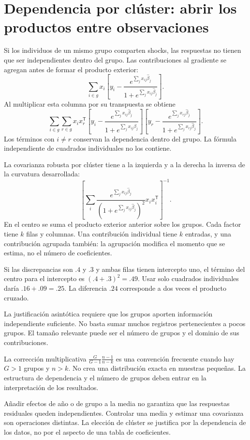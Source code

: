 \documentclass[11pt,a4paper]{article}
\newcommand{\T}{^{\mathsf T}}
\begin{document}
\clearpage
\section{Dependencia por clúster: abrir los productos entre observaciones}\label{logit58}
Si los individuos de un mismo grupo comparten shocks,
las respuestas no tienen que ser independientes dentro del grupo.
Las contribuciones al gradiente se agregan antes de formar el
producto exterior:
\[
\sum_{i\in g}x_i\left[
y_i-\frac{e^{\sum_jx_{ij}\widehat\beta_j}}
{1+e^{\sum_jx_{ij}\widehat\beta_j}}\right].
\]
Al multiplicar esta columna por su transpuesta se obtiene
\[
\sum_{i\in g}\sum_{r\in g}
x_ix_r\T
\left[y_i-\frac{e^{\sum_jx_{ij}\widehat\beta_j}}
{1+e^{\sum_jx_{ij}\widehat\beta_j}}\right]
\left[y_r-\frac{e^{\sum_jx_{rj}\widehat\beta_j}}
{1+e^{\sum_jx_{rj}\widehat\beta_j}}\right].
\]
Los términos con $i\ne r$ conservan la dependencia dentro del grupo.
La fórmula independiente de cuadrados individuales no los contiene.

La covarianza robusta por clúster tiene a la izquierda y a la
derecha la inversa de la curvatura desarrollada:
\[
\left[\sum_i
\frac{e^{\sum_jx_{ij}\widehat\beta_j}}
{(1+e^{\sum_jx_{ij}\widehat\beta_j})^2}x_ix_i\T\right]^{-1}.
\]
En el centro se suma el producto exterior anterior sobre los grupos.
Cada factor tiene $k$ filas y columnas.
Una contribución individual tiene $k$ entradas,
y una contribución agrupada también: la agrupación modifica
el momento que se estima, no el número de coeficientes.

\begin{ejemplo}
Si las discrepancias son $.4$ y $.3$ y ambas filas tienen
intercepto uno, el término del centro para el intercepto es
$(.4+.3)^2=.49$.
Usar solo cuadrados individuales daría $.16+.09=.25$.
La diferencia $.24$ corresponde a dos veces el producto cruzado.
\end{ejemplo}
La justificación asintótica requiere que los grupos aporten
información independiente suficiente.
No basta sumar muchos registros pertenecientes a pocos grupos.
El tamaño relevante puede ser el número de grupos y el dominio
de sus contribuciones.

La corrección multiplicativa
$\frac{G}{G-1}\frac{n-1}{n-k}$ es una convención frecuente
cuando hay $G>1$ grupos y $n>k$.
No crea una distribución exacta en muestras pequeñas.
La estructura de dependencia y el número de grupos deben
entrar en la interpretación de los resultados.

Añadir efectos de año o de grupo a la media no garantiza
que las respuestas residuales queden independientes.
Controlar una media y estimar una covarianza son operaciones
distintas. La elección de clúster se justifica por la
dependencia de los datos, no por el aspecto de una tabla de coeficientes.
\end{document}
